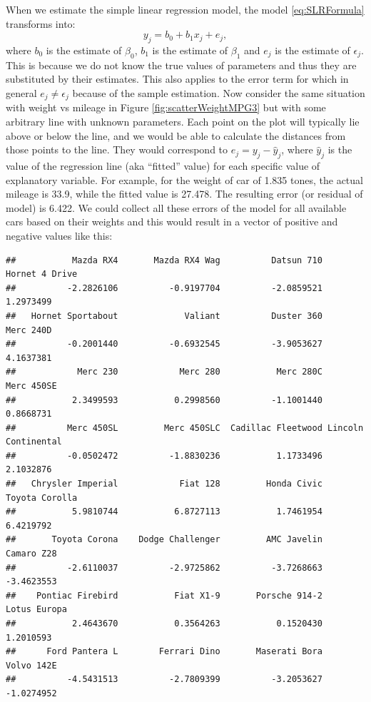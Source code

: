 \documentclass[
]{book}
\theoremstyle{definition}
\theoremstyle{definition}
\theoremstyle{definition}
\theoremstyle{definition}
\theoremstyle{remark}
\begin{document}
When we estimate the simple linear regression model, the model \eqref{eq:SLRFormula} transforms into:
\begin{equation}
    y_j = {b}_0 + {b}_1 x_j + e_j ,
    \label{eq:SLRFormulaEstimated}
\end{equation}
where \(b_0\) is the estimate of \(\beta_0\), \(b_1\) is the estimate of \(\beta_1\) and \(e_j\) is the estimate of \(\epsilon_j\). This is because we do not know the true values of parameters and thus they are substituted by their estimates. This also applies to the error term for which in general \(e_j \neq \epsilon_j\) because of the sample estimation. Now consider the same situation with weight vs mileage in Figure \ref{fig:scatterWeightMPG3} but with some arbitrary line with unknown parameters. Each point on the plot will typically lie above or below the line, and we would be able to calculate the distances from those points to the line. They would correspond to \(e_j = y_j - \hat{y}_j\), where \(\hat{y}_j\) is the value of the regression line (aka ``fitted'' value) for each specific value of explanatory variable. For example, for the weight of car of 1.835 tones, the actual mileage is 33.9, while the fitted value is 27.478. The resulting error (or residual of model) is 6.422. We could collect all these errors of the model for all available cars based on their weights and this would result in a vector of positive and negative values like this:

\begin{verbatim}
##           Mazda RX4       Mazda RX4 Wag          Datsun 710      Hornet 4 Drive 
##          -2.2826106          -0.9197704          -2.0859521           1.2973499 
##   Hornet Sportabout             Valiant          Duster 360           Merc 240D 
##          -0.2001440          -0.6932545          -3.9053627           4.1637381 
##            Merc 230            Merc 280           Merc 280C          Merc 450SE 
##           2.3499593           0.2998560          -1.1001440           0.8668731 
##          Merc 450SL         Merc 450SLC  Cadillac Fleetwood Lincoln Continental 
##          -0.0502472          -1.8830236           1.1733496           2.1032876 
##   Chrysler Imperial            Fiat 128         Honda Civic      Toyota Corolla 
##           5.9810744           6.8727113           1.7461954           6.4219792 
##       Toyota Corona    Dodge Challenger         AMC Javelin          Camaro Z28 
##          -2.6110037          -2.9725862          -3.7268663          -3.4623553 
##    Pontiac Firebird           Fiat X1-9       Porsche 914-2        Lotus Europa 
##           2.4643670           0.3564263           0.1520430           1.2010593 
##      Ford Pantera L        Ferrari Dino       Maserati Bora          Volvo 142E 
##          -4.5431513          -2.7809399          -3.2053627          -1.0274952
\end{verbatim}
\end{document}
